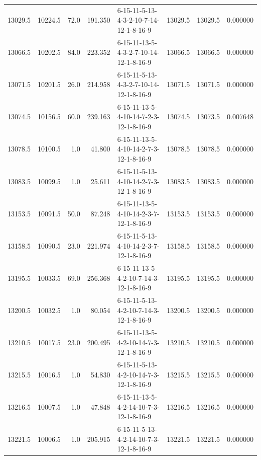 \begin{tabular}{rrrrlrrr}
 13029.5 &  10224.5 &           72.0 &            191.350 &  6-15-11-5-13-4-3-2-10-7-14-12-1-8-16-9 &       13029.5 &         13029.5 &  0.000000 \\
 13066.5 &  10202.5 &           84.0 &            223.352 &  6-15-11-13-5-4-3-2-7-10-14-12-1-8-16-9 &       13066.5 &         13066.5 &  0.000000 \\
 13071.5 &  10201.5 &           26.0 &            214.958 &  6-15-11-5-13-4-3-2-7-10-14-12-1-8-16-9 &       13071.5 &         13071.5 &  0.000000 \\
 13074.5 &  10156.5 &           60.0 &            239.163 &  6-15-11-13-5-4-10-14-7-2-3-12-1-8-16-9 &       13074.5 &         13073.5 &  0.007648 \\
 13078.5 &  10100.5 &            1.0 &             41.800 &  6-15-11-13-5-4-10-14-2-7-3-12-1-8-16-9 &       13078.5 &         13078.5 &  0.000000 \\
 13083.5 &  10099.5 &            1.0 &             25.611 &  6-15-11-5-13-4-10-14-2-7-3-12-1-8-16-9 &       13083.5 &         13083.5 &  0.000000 \\
 13153.5 &  10091.5 &           50.0 &             87.248 &  6-15-11-13-5-4-10-14-2-3-7-12-1-8-16-9 &       13153.5 &         13153.5 &  0.000000 \\
 13158.5 &  10090.5 &           23.0 &            221.974 &  6-15-11-5-13-4-10-14-2-3-7-12-1-8-16-9 &       13158.5 &         13158.5 &  0.000000 \\
 13195.5 &  10033.5 &           69.0 &            256.368 &  6-15-11-13-5-4-2-10-7-14-3-12-1-8-16-9 &       13195.5 &         13195.5 &  0.000000 \\
 13200.5 &  10032.5 &            1.0 &             80.054 &  6-15-11-5-13-4-2-10-7-14-3-12-1-8-16-9 &       13200.5 &         13200.5 &  0.000000 \\
 13210.5 &  10017.5 &           23.0 &            200.495 &  6-15-11-13-5-4-2-10-14-7-3-12-1-8-16-9 &       13210.5 &         13210.5 &  0.000000 \\
 13215.5 &  10016.5 &            1.0 &             54.830 &  6-15-11-5-13-4-2-10-14-7-3-12-1-8-16-9 &       13215.5 &         13215.5 &  0.000000 \\
 13216.5 &  10007.5 &            1.0 &             47.848 &  6-15-11-13-5-4-2-14-10-7-3-12-1-8-16-9 &       13216.5 &         13216.5 &  0.000000 \\
 13221.5 &  10006.5 &            1.0 &            205.915 &  6-15-11-5-13-4-2-14-10-7-3-12-1-8-16-9 &       13221.5 &         13221.5 &  0.000000 \\

\end{tabular}
